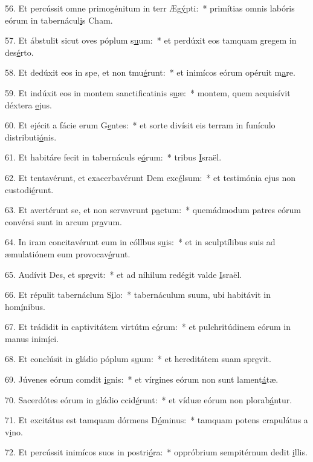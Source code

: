 56. Et percússit omne primogénitum in terr Æg\uline{ý}pti:~* primítias omnis labóris eórum in tabernácul\uline{i}s Cham.\par 
57. Et ábstulit sicut oves póplum s\uline{u}um:~* et perdúxit eos tamquam gregem in des\uline{é}rto.\par 
58. Et dedúxit eos in spe, et non tmu\uline{é}runt:~* et inimícos eórum opéruit m\uline{a}re.\par 
59. Et indúxit eos in montem sanctificatinis s\uline{u}æ:~* montem, quem acquisívit déxtera \uline{e}jus.\par 
60. Et ejécit a fácie erum G\uline{e}ntes:~* et sorte divísit eis terram in funículo distributi\uline{ó}nis.\par 
61. Et habitáre fecit in tabernáculs e\uline{ó}rum:~* tribus \uline{I}sraël.\par 
62. Et tentavérunt, et exacerbavérunt Dem exc\uline{é}lsum:~* et testimónia ejus non custodi\uline{é}runt.\par 
63. Et avertérunt se, et non servavrunt p\uline{a}ctum:~* quemádmodum patres eórum convérsi sunt in arcum pr\uline{a}vum.\par 
64. In iram concitavérunt eum in cóllbus s\uline{u}is:~* et in sculptílibus suis ad æmulatiónem eum provocav\uline{é}runt.\par 
65. Audívit Des, et spr\uline{e}vit:~* et ad níhilum redégit valde \uline{I}sraël.\par 
66. Et répulit tabernáclum S\uline{i}lo:~* tabernáculum suum, ubi habitávit in hom\uline{í}nibus.\par 
67. Et trádidit in captivitátem virtútm e\uline{ó}rum:~* et pulchritúdinem eórum in manus inim\uline{í}ci.\par 
68. Et conclúsit in gládio póplum s\uline{u}um:~* et hereditátem suam spr\uline{e}vit.\par 
69. Júvenes eórum comdit \uline{i}gnis:~* et vírgines eórum non sunt lament\uline{á}tæ.\par 
70. Sacerdótes eórum in gládio ccid\uline{é}runt:~* et víduæ eórum non plorab\uline{á}ntur.\par 
71. Et excitátus est tamquam dórmens D\uline{ó}minus:~* tamquam potens crapulátus a v\uline{i}no.\par 
72. Et percússit inimícos suos in postri\uline{ó}ra:~* oppróbrium sempitérnum dedit \uline{i}llis.\par 
